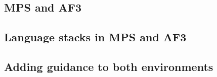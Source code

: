 \subsection{MPS and AF3}

\subsection{Language stacks in MPS and AF3}

\subsection{Adding guidance to both environments}
